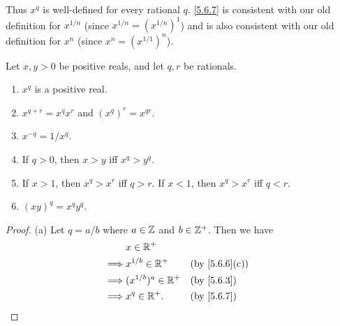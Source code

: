 \begin{note}
  Thus \(x^q\) is well-defined for every rational \(q\).
  \cref{5.6.7} is consistent with our old definition for \(x^{1 / n}\) (since \(x^{1 / n} = (x^{1 / n})^1\)) and is also consistent with our old definition for \(x^n\) (since \(x^n = (x^{1 / 1})^n\)).
\end{note}

\begin{lem}\label{5.6.9}
  Let \(x, y > 0\) be positive reals, and let \(q, r\) be rationals.
  \begin{enumerate}
    \item \(x^q\) is a positive real.
    \item \(x^{q + r} = x^q x^r\) and \((x^q)^r = x^{qr}\).
    \item \(x^{-q} = 1 / x^q\).
    \item If \(q > 0\), then \(x > y\) iff \(x^q > y^q\).
    \item If \(x > 1\), then \(x^q > x^r\) iff \(q > r\).
          If \(x < 1\), then \(x^q > x^r\) iff \(q < r\).
    \item \((xy)^q = x^q y^q\).
  \end{enumerate}
\end{lem}

\begin{proof}{(a)}
  Let \(q = a / b\) where \(a \in \mathbb{Z}\) and \(b \in \mathbb{Z}^+\).
  Then we have
  \begin{align*}
             & x \in \R^+                                \\
    \implies & x^{1 / b} \in \R^+     &  & \by{5.6.6}[c] \\
    \implies & (x^{1 / b})^a \in \R^+ &  & \by{5.6.3}    \\
    \implies & x^q \in \R^+.          &  & \by{5.6.7}
  \end{align*}
\end{proof}

